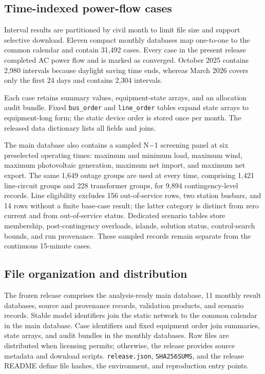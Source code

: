\documentclass[
  10pt]{article}
\begin{document}
\subsection{Time-indexed power-flow
cases}\label{time-indexed-power-flow-cases}

Interval results are partitioned by civil month to limit file size and
support selective download. Eleven compact monthly databases map
one-to-one to the common calendar and contain 31,492 cases. Every case
in the present release completed AC power flow and is marked as
converged. October 2025 contains 2,980 intervals because daylight saving
time ends, whereas March 2026 covers only the first 24 days and contains
2,304 intervals.

Each case retains summary values, equipment-state arrays, and an
allocation audit bundle. Fixed \texttt{bus\_order} and
\texttt{line\_order} tables expand state arrays to equipment-long form;
the static device order is stored once per month. The released data
dictionary lists all fields and joins.

The main database also contains a sampled N−1 screening panel at six
preselected operating times: maximum and minimum load, maximum wind,
maximum photovoltaic generation, maximum net import, and maximum net
export. The same 1,649 outage groups are used at every time, comprising
1,421 line-circuit groups and 228 transformer groups, for 9,894
contingency-level records. Line eligibility excludes 156 out-of-service
rows, two station busbars, and 14 rows without a finite base-case
result; the latter category is distinct from zero current and from
out-of-service status. Dedicated scenario tables store membership,
post-contingency overloads, islands, solution status, control-search
bounds, and run provenance. These sampled records remain separate from
the continuous 15-minute cases.

\subsection{File organization and
distribution}\label{file-organization-and-distribution}

The frozen release comprises the analysis-ready main database, 11
monthly result databases, source and provenance records, validation
products, and scenario records. Stable model identifiers join the static
network to the common calendar in the main database. Case identifiers
and fixed equipment order join summaries, state arrays, and audit
bundles in the monthly databases. Raw files are distributed when
licensing permits; otherwise, the release provides source metadata and
download scripts. \texttt{release.json}, \texttt{SHA256SUMS}, and the
release README define file hashes, the environment, and reproduction
entry points.
\end{document}
